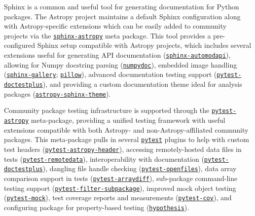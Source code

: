 \documentclass[modern]{aastex631}
\begin{document}
Sphinx is a common and useful tool for generating documentation for Python
packages. The Astropy project maintains a default Sphinx configuration along
with Astropy-specific extensions which can be easily added to community
projects via the
\href{https://github.com/astropy/sphinx-astropy}{\texttt{sphinx-astropy}} meta
package. This tool provides a pre-configured Sphinx setup compatible with
Astropy projects, which includes several extensions useful for generating API
documentation
(\href{https://github.com/astropy/sphinx-automodapi}{\texttt{sphinx-automodapi}}),
allowing for Numpy docstring parsing
(\href{https://github.com/numpy/numpydoc}{\texttt{numpydoc}}), embedded image
handling
(\href{https://github.com/sphinx-gallery/sphinx-gallery}{\texttt{sphinx-gallery}};
\href{https://github.com/python-pillow}{\texttt{pillow}}), advanced
documentation testing support
(\href{https://github.com/astropy/pytest-doctestplus}{\texttt{pytest-doctestplus}}),
and providing a custom documentation theme ideal for analysis packages
(\href{https://github.com/astropy/sphinx-astropy}{\texttt{astropy-sphinx-theme}}).

Community package testing infrastructure is supported through the
\href{https://github.com/astropy/pytest-astropy}{\texttt{pytest-astropy}}
meta-package, providing a unified testing framework with useful extensions
compatible with both Astropy- and non-Astropy-affiliated community packages.
This meta-package pulls in several
\href{https://github.com/pytest-dev/pytest}{\texttt{pytest}} plugins to help
with custom test headers
(\href{https://github.com/astropy/pytest-astropy-header}{\texttt{pytest-astropy-header}}),
accessing remotely-hosted data files in tests
(\href{https://github.com/astropy/pytest-remotedata}{\texttt{pytest-remotedata}}),
interoperability with documentation
(\href{https://github.com/astropy/pytest-doctestplus}{\texttt{pytest-doctestplus}}),
dangling file handle checking
(\href{https://github.com/astropy/pytest-openfiles}{\texttt{pytest-openfiles}}),
data array comparison support in tests
(\href{https://github.com/astropy/pytest-arraydiff}{\texttt{pytest-arraydiff}}),
sub-package command-line testing support
(\href{https://github.com/astropy/pytest-filter-subpackage}{\texttt{pytest-filter-subpackage}}),
improved mock object testing
(\href{https://github.com/pytest-dev/pytest-mock}{\texttt{pytest-mock}}), test
coverage reports and measurements
(\href{https://github.com/pytest-dev/pytest-cov}{\texttt{pytest-cov}}), and
configuring package for property-based testing
(\href{https://github.com/HypothesisWorks/hypothesis}{\texttt{hypothesis}}).
\end{document}
